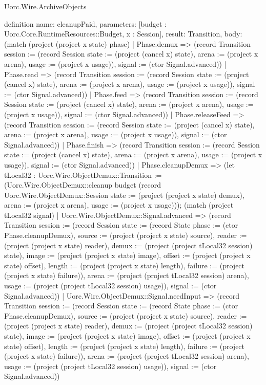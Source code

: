 \begin{lexlean}{Uorc.Wire.ArchiveObjects}
\begin{semanticmodule}
definition{
  name: cleanupPaid,
  parameters: [budget : Uorc.Core.RuntimeResources::Budget, x : Session],
  result: Transition,
  body: (match (project (project x state) phase)
    | Phase.demux => (record Transition {session := (record Session {state := (project (cancel x) state), arena := (project x arena), usage := (project x usage)}), signal := (ctor Signal.advanced)})
    | Phase.read => (record Transition {session := (record Session {state := (project (cancel x) state), arena := (project x arena), usage := (project x usage)}), signal := (ctor Signal.advanced)})
    | Phase.feed => (record Transition {session := (record Session {state := (project (cancel x) state), arena := (project x arena), usage := (project x usage)}), signal := (ctor Signal.advanced)})
    | Phase.releaseFeed => (record Transition {session := (record Session {state := (project (cancel x) state), arena := (project x arena), usage := (project x usage)}), signal := (ctor Signal.advanced)})
    | Phase.finish => (record Transition {session := (record Session {state := (project (cancel x) state), arena := (project x arena), usage := (project x usage)}), signal := (ctor Signal.advanced)})
    | Phase.cleanupDemux => (let tLocal32 : Uorc.Wire.ObjectDemux::Transition := (Uorc.Wire.ObjectDemux::cleanup budget (record Uorc.Wire.ObjectDemux::Session {state := (project (project x state) demux), arena := (project x arena), usage := (project x usage)})); (match (project tLocal32 signal)
      | Uorc.Wire.ObjectDemux::Signal.advanced => (record Transition {session := (record Session {state := (record State {phase := (ctor Phase.cleanupDemux), source := (project (project x state) source), reader := (project (project x state) reader), demux := (project (project tLocal32 session) state), image := (project (project x state) image), offset := (project (project x state) offset), length := (project (project x state) length), failure := (project (project x state) failure)}), arena := (project (project tLocal32 session) arena), usage := (project (project tLocal32 session) usage)}), signal := (ctor Signal.advanced)})
      | Uorc.Wire.ObjectDemux::Signal.needInput => (record Transition {session := (record Session {state := (record State {phase := (ctor Phase.cleanupDemux), source := (project (project x state) source), reader := (project (project x state) reader), demux := (project (project tLocal32 session) state), image := (project (project x state) image), offset := (project (project x state) offset), length := (project (project x state) length), failure := (project (project x state) failure)}), arena := (project (project tLocal32 session) arena), usage := (project (project tLocal32 session) usage)}), signal := (ctor Signal.advanced)})
}
\end{semanticmodule}
\end{lexlean}
